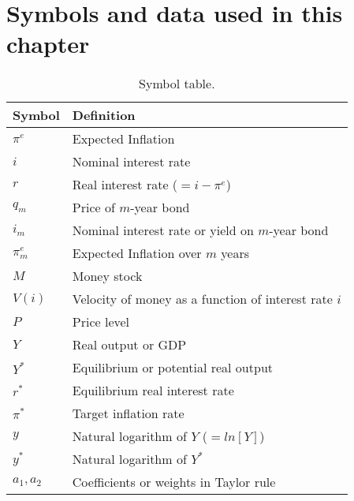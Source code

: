 \section*{Symbols and data used in this chapter}

\begin{table}[H]
\centering
\caption{Symbol table.}
\begin{tabular*}{0.85\textwidth}{l@{\extracolsep{\fill}}l}
\toprule
Symbol & Definition\\
\midrule
$\pi^e$     &Expected Inflation\\
$i$                &Nominal interest rate\\
$r$                &Real interest rate ($= i- \pi^e$)\\
$q_m$             &Price of $m$-year bond  \\
$i_m$           &Nominal interest rate or yield
 on $m$-year bond \\
$\pi^e_m$       &Expected Inflation over $m$ years\\
$M$                &Money stock\\
$V(i)$             &Velocity of money as a function of interest rate $i$\\
$P$                &Price level\\
$Y$               &Real output or GDP\\
$Y^*$          &Equilibrium or potential real output\\
$r^*$          &Equilibrium real interest rate\\
$\pi^*$        &Target inflation rate\\
$y$               &Natural logarithm of $Y$ ($=ln[Y]$)\\
$y^*$          &Natural logarithm of $Y^*$\\
$a_1,a_2$      &Coefficients or weights in Taylor rule\\
\bottomrule
\end{tabular*}
\end{table}

